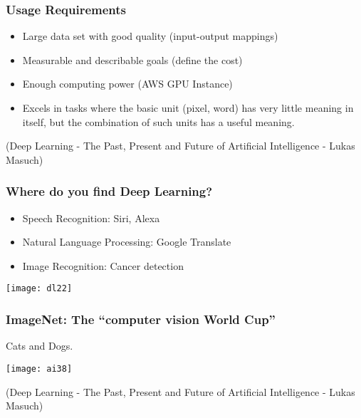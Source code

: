 \begin{frame}[fragile]\frametitle{Usage Requirements}
\begin{itemize}
\item Large data set with good quality (input-output mappings)
\item Measurable and describable goals (define the cost)
\item Enough computing power (AWS GPU Instance)
\item Excels in tasks where the basic unit (pixel, word) has very little
meaning in itself, but the combination of such units has a useful
meaning.
\end{itemize}
{\tiny (Deep Learning - The Past, Present and Future of Artificial Intelligence - Lukas Masuch)}
\end{frame}

\begin{frame}[fragile] \frametitle{Where do you find Deep Learning?}

\begin{itemize}
\item Speech Recognition: Siri, Alexa
\item Natural Language Processing: Google Translate
\item Image Recognition: Cancer detection
\end{itemize}
\begin{center}
\texttt{[image: dl22]}
\end{center}
\end{frame}


\begin{frame}[fragile]\frametitle{ImageNet: The ``computer vision World Cup''}
Cats and Dogs.
\begin{center}
\texttt{[image: ai38]}
\end{center}
{\tiny (Deep Learning - The Past, Present and Future of Artificial Intelligence - Lukas Masuch)}
\end{frame}

